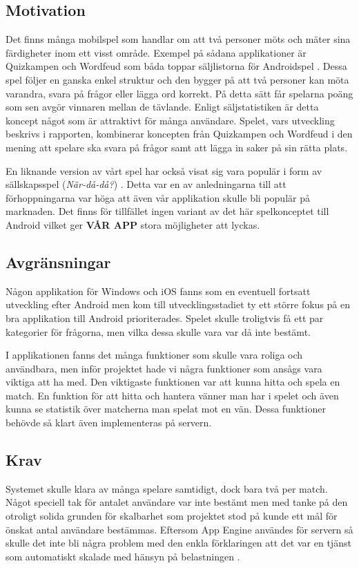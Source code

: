 \documentclass[a4paper, 11pt]{article}
\begin{document}
\subsection{Motivation}
Det finns många mobilspel som handlar om att två personer möts och mäter sina färdigheter inom ett visst område. Exempel på sådana applikationer är Quizkampen och Wordfeud som båda toppar säljlistorna för Androidspel \cite{appsalesrating}. Dessa spel följer en ganska enkel struktur och den bygger på att två personer kan möta varandra, svara på frågor eller lägga ord korrekt. På detta sätt får spelarna poäng som sen avgör vinnaren mellan de tävlande. Enligt säljstatistiken \cite{appsalesrating} är detta koncept något som är attraktivt för många användare. Spelet, vars utveckling beskrivs i rapporten, kombinerar koncepten från Quizkampen och Wordfeud i den mening att spelare ska svara på frågor samt att lägga in saker på sin rätta plats. 

En liknande version av vårt spel har också visat sig vara populär i form av sällskapsspel (\textit{När-då-då?}) \cite{nardada}. Detta var en av anledningarna till att förhoppningarna var höga att även vår applikation skulle bli populär på marknaden. Det finns för tillfället ingen variant av det här spelkonceptet till Android vilket ger \textbf{VÅR APP} stora möjligheter att lyckas.

\subsection{Avgränsningar}
Någon applikation för Windows och iOS fanns som en eventuell fortsatt utveckling efter Android men kom till utvecklingsstadiet ty ett större fokus på en bra applikation till Android prioriterades. Spelet skulle troligtvis få ett par kategorier för frågorna, men vilka dessa skulle vara var då inte bestämt. 

I applikationen fanns det många funktioner som skulle vara roliga och användbara, men inför projektet hade vi några funktioner som ansågs vara viktiga att ha med. Den viktigaste funktionen var att kunna hitta och spela en match. En funktion för att hitta och hantera vänner man har i spelet och även kunna se statistik över matcherna man spelat mot en vän. Dessa funktioner behövde så klart även implementeras på servern.

\subsection{Krav}
Systemet skulle klara av många spelare samtidigt, dock bara två per match. Något speciell tak för antalet användare var inte bestämt men med tanke på den otroligt solida grunden för skalbarhet som projektet stod på kunde ett mål för önskat antal användare bestämmas. Eftersom App Engine användes för servern så skulle det inte bli några problem med den enkla förklaringen att det var en tjänst som automatiskt skalade med hänsyn på belastningen \cite{appenginescalability}. 
\end{document}
